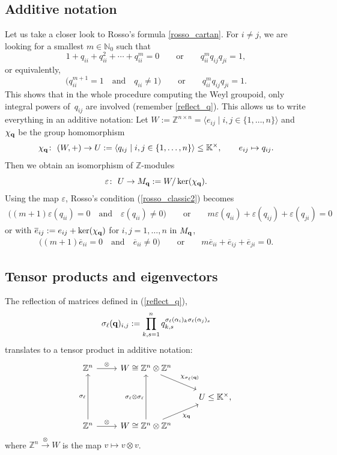 \documentclass[pdftex]{sigma}
\numberwithin{equation}{section}
\newcommand{\NN }{\mathbb{N}}
\newcommand{\ZZ }{\mathbb{Z}}
\newcommand{\qq }{{\bf q}}
\newcommand{\KK }{\mathbb{K}}
\newcommand{\bich }{\chi}
\begin{document}
\subsection{Additive notation}\label{add_not}
Let us take a closer look to Rosso's formula \eqref{rosso_cartan}. For $i\ne j$, we are looking for a smallest $m\in\NN_0$ such that
\begin{equation*}%
1+q_{ii}+q_{ii}^2+\cdots+q_{ii}^m=0 \qquad\text{or}\qquad q_{ii}^m q_{ij}q_{ji}=1,
\end{equation*}
or equivalently,
\begin{equation}\label{rosso_classic2}
\big(q_{ii}^{m+1}=1\quad\text{and}\quad q_{ii}\ne 1\big) \qquad\text{or}\qquad q_{ii}^m q_{ij}q_{ji}=1.
\end{equation}
This shows that in the whole procedure computing the Weyl groupoid, only integral powers of~$q_{ij}$ are involved (remember \eqref{reflect_q}).
This allows us to write everything in an additive notation:
Let $W:=\ZZ^{n\times n} = \langle e_{ij}\mid i,j\in \{1,\dots,n\}\rangle$ and $\bich_\qq$ be the group homomorphism
\[ \bich_\qq \colon \ (W,+) \rightarrow U:=\langle q_{ij} \mid i,j\in \{1,\dots,n\}\rangle\le \KK^\times,
\qquad e_{ij}\mapsto q_{ij}. \]
Then we obtain an isomorphism of $\ZZ$-modules
\[ \varepsilon \colon \ U \rightarrow M_\qq:=W/\ker(\bich_\qq). \]
Using the map $\varepsilon$, Rosso's condition (\ref{rosso_classic2}) becomes
\begin{gather*}%
\big((m+1)\varepsilon(q_{ii})=0\quad\text{and}\quad \varepsilon(q_{ii})\ne 0\big) \qquad\text{or}\qquad m\varepsilon(q_{ii})+\varepsilon(q_{ij})+\varepsilon(q_{ji})=0
\end{gather*}
or with $\overline{e}_{ij}:=e_{ij}+\ker(\bich_\qq)$ for $i,j=1,\dots,n$ in $M_\qq$,
\begin{gather*}%
\big((m+1)\overline{e}_{ii}=0\quad\text{and}\quad \overline{e}_{ii}\ne 0\big) \qquad\text{or}\qquad m\overline{e}_{ii}+\overline{e}_{ij}+\overline{e}_{ji}=0.
\end{gather*}

\subsection{Tensor products and eigenvectors}\label{add_not_tensor}
The reflection of matrices defined in (\ref{reflect_q}),
\[ \sigma_\ell(\qq)_{i,j} := \prod_{k,s=1}^n q_{k,s}^{\sigma_\ell(\alpha_i)_k \sigma_\ell(\alpha_j)_s} \]
translates to a tensor product in additive notation:
\[
\begin{tikzcd}
\ZZ^n \arrow[r, "\otimes"] & W\cong \ZZ^n\otimes\ZZ^n \arrow[dr, "\bich_{\sigma_\ell(\qq)}"]
& \\
 & & U \le \KK^\times ,\\
 \ZZ^n \arrow[r, "\otimes"] \arrow[uu, "\sigma_\ell"]
 & W\cong \ZZ^n\otimes\ZZ^n \arrow[ur, "\bich_{\qq}", swap] \arrow[uu, "\sigma_\ell \otimes \sigma_\ell"] &
\end{tikzcd}
\]
where $\ZZ^n \stackrel{\otimes}{\longrightarrow} W$ is the map $v \mapsto v\otimes v$.
\end{document}
